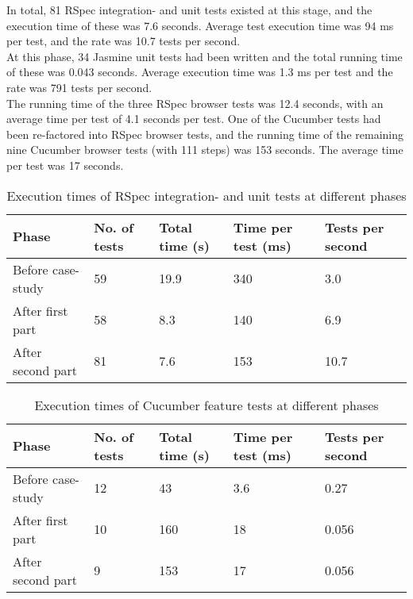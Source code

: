 In total, 81 RSpec integration- and unit tests existed at this stage,
and the execution time of these was 7.6 seconds. Average test execution
time was 94 ms per test, and the rate was 10.7 tests per
second.\\

At this phase, 34 Jasmine unit tests had been written and the total
running time of these was 0.043 seconds. Average execution time was 1.3
ms per test and the rate was 791 tests per second.\\

The running time of the three RSpec browser tests was 12.4 seconds, with
an average time per test of 4.1 seconds per test. One of the Cucumber
tests had been re-factored into RSpec browser tests, and the running
time of the remaining nine Cucumber browser tests (with 111 steps) was
153 seconds. The average time per test was 17 seconds.\\


\begin{table}[t]
    \centering
    \begin{tabular}{l l l l l}
        Phase & No. of tests & Total time (s) & Time per test (ms) & Tests per second\\
        \hline
        Before case-study & 59 & 19.9& 340 & 3.0 \\
        After first part  & 58 & 8.3 & 140 & 6.9 \\
        After second part & 81 & 7.6  & 153 & 10.7\\
    \end{tabular}
    \caption{ Execution times of RSpec integration- and unit tests at different phases }
    \label{tab:unit_times}
\end{table}


\begin{table}[t]
    \centering
    \begin{tabular}{l l l l l}
        Phase & No. of tests & Total time (s) & Time per test (ms) & Tests per second \\
        \hline
        Before case-study & 12 & 43 & 3.6 & 0.27 \\
        After first part  & 10 & 160 & 18 & 0.056\\
        After second part & 9 &  153 & 17 & 0.056\\
    \end{tabular}
    \caption{ Execution times of Cucumber feature tests at different phases }
    \label{tab:cucumber_times}
\end{table}
